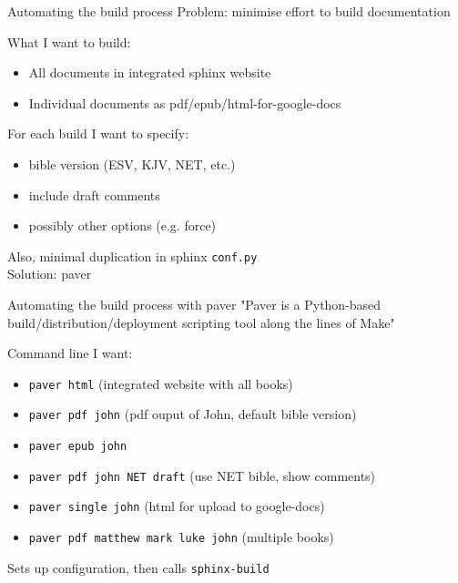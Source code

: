 \documentclass{beamer}
\begin{document}
\begin{frame}{Automating the build process}
Problem: minimise effort to build documentation

What I want to build:
\begin{itemize}
\item All documents in integrated sphinx website
\item Individual documents as pdf/epub/html-for-google-docs
\end{itemize}
For each build I want to specify:
\begin{itemize}
\item bible version (ESV, KJV, NET, etc.)
\item include draft comments
\item possibly other options (e.g. force)
\end{itemize}
Also, minimal duplication in sphinx \texttt{conf.py}\\

Solution: paver

\end{frame}

\begin{frame}{Automating the build process with paver}
"Paver is a Python-based build/distribution/deployment 
scripting tool along the lines of Make"

Command line I want:
\begin{itemize}
\item \texttt{paver html} (integrated website with all books)
\item \texttt{paver pdf john} (pdf ouput of John, default bible version)
\item \texttt{paver epub john}
\item \texttt{paver pdf john NET draft} (use NET bible, show comments)
\item \texttt{paver single john} (html for upload to google-docs)
\item \texttt{paver pdf matthew mark luke john} (multiple books)
\end{itemize}

Sets up configuration, then calls \texttt{sphinx-build}

\end{frame}
\end{document}

